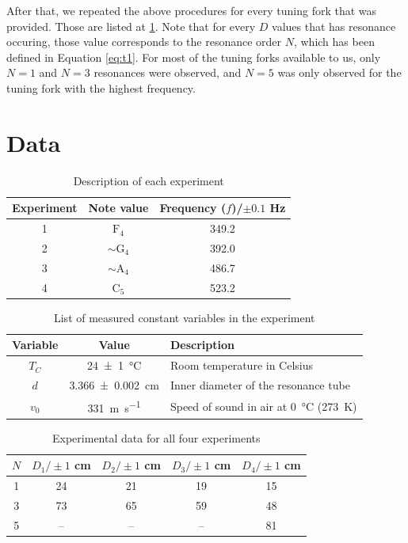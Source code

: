 \documentclass[letter]{article}
\numberwithin{equation}{section}
\numberwithin{figure}{section}
\numberwithin{table}{section}
\begin{document}
After that, we repeated the above procedures for every tuning fork that was provided. Those are listed at \ref{table:d1}. Note that for every \(D\) values that has resonance occuring, those value corresponds to the resonance order \(N\), which has been defined in Equation \eqref{eq:t1}. For most of the tuning forks available to us, only \(N = 1\) and \(N = 3\) resonances were observed, and \(N = 5\) was only observed for the tuning fork with the highest frequency.

\pagebreak
\section{Data}
\begin{table}[!h]
  \setlength\extrarowheight{2.5pt}
  \centering
  \begin{tabular}{|c|c|c|}
    \hline
    Experiment      & Note value            & Frequency (\(f\))/\(\pm 0.1\) \si{Hz} \\
    \hline
    1               & \(\mathrm{F}_4\)      & 349.2 \\
    2               & \(\sim \mathrm{G}_4\) & 392.0 \\
    3               & \(\sim \mathrm{A}_4\) & 486.7 \\
    4               & \(\mathrm{C}_5\)      & 523.2 \\
    \hline
  \end{tabular}
  \caption{Description of each experiment}
  \label{table:d1}
\end{table}

\begin{table}[!h]
  \setlength\extrarowheight{2.5pt}
  \centering
  \begin{tabular}{|c|c|l|}
    \hline
    Variable  & Value                       & Description\\
    \hline
    \(T_C\)   & \SI{24(1)}{\celsius}        & {Room temperature in Celsius}\\
    \(d\)     & \SI{3.366(2)}{\centi\metre} & {Inner diameter of the resonance tube}\\
    \(v_0\)   & \SI{331}{\metre\per\second} & {Speed of sound in air at \SI{0}{\celsius} (\SI{273}{\kelvin})}\\
    \hline
  \end{tabular}
  \caption{List of measured constant variables in the experiment}
  \label{table:d2}
\end{table}

\begin{table}[!h]
  \setlength\extrarowheight{2.5pt}
  \centering
  \begin{tabular}{|c|c|c|c|c|}
    \hline
    \(N\) & \(D_1 / \pm 1\) \si{cm} & \(D_2 / \pm 1\) \si{cm} & \(D_3 / \pm 1\) \si{cm} & \(D_4 / \pm 1\) \si{cm} \\
    \hline
    1  & 24  & 21  & 19  & 15 \\
    3  & 73  & 65  & 59  & 48 \\
    5  & --  & --  & --  & 81 \\
    \hline
  \end{tabular}
  \caption{Experimental data for all four experiments}
  \label{table:d3}
\end{table}
\end{document}
